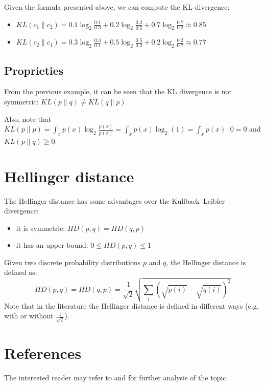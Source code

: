 Given the formula presented above, we can compute the KL divergence:
\begin{itemize}
    \item $\mathit{KL}(c_1 \| c_2) = 0.1 \log_2 \frac{0.1}{0.3} + 0.2 \log_2 \frac{0.2}{0.5} + 0.7 \log_2 \frac{0.7}{0.2} \approx 0.85$
    \item $\mathit{KL}(c_2 \| c_1) = 0.3 \log_2 \frac{0.3}{0.1} + 0.5 \log_2 \frac{0.5}{0.2} + 0.2 \log_2 \frac{0.2}{0.7} \approx 0.77$
\end{itemize}


\subsection{Proprieties}
From the previous example, it can be seen that the KL divergence is not symmetric: $\mathit{KL}(p \| q) \neq \mathit{KL}(q \| p)$.

Also, note that $\mathit{KL}(p \| p) = \int_x p(x) \log_2 \frac{p(x)}{p(x)} = \int_x p(x) \log_2 (1) = \int_x p(x) \cdot 0 = 0$
and $\mathit{KL}(p \| q) \geq 0$.

\section{Hellinger distance}
The Hellinger distance has some advantages over the Kullback–Leibler divergence:
\begin{itemize}
    \item it is symmetric: $\mathit{HD}(p, q) = \mathit{HD}(q, p)$
    \item it has an upper bound: $0 \leq \mathit{HD}(p, q) \leq 1$
\end{itemize}

Given two discrete probability distributions $p$ and $q$, the Hellinger distance is defined as:
$$\mathit{HD}(p, q) = \mathit{HD}(q, p) = \frac{1}{\sqrt{2}} \sqrt{\sum_i (\sqrt{p(i)} - \sqrt{q(i)})^2}$$
Note that in the literature the Hellinger distance is defined in different ways (e.g. with or without $\frac{1}{\sqrt{2}}$).

\section{References}
The interested reader may refer to \cite{Joyce2011} and \cite{Hellinger1909} for further analysis of the topic.